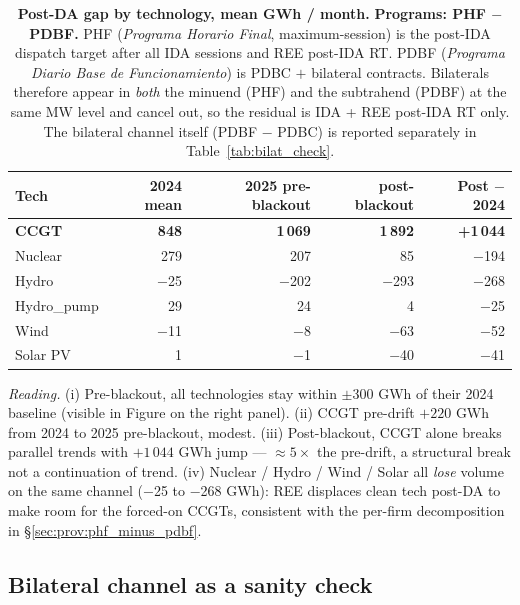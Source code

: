 \documentclass[11pt,a4paper]{article}
\begin{document}
\begin{table}[H]
\centering
\caption{\textbf{Post-DA gap by technology, mean GWh / month.} \textbf{Programs: PHF $-$ PDBF.} PHF (\emph{Programa Horario Final}, maximum-session) is the post-IDA dispatch target after all IDA sessions and REE post-IDA RT. PDBF (\emph{Programa Diario Base de Funcionamiento}) is PDBC $+$ bilateral contracts. Bilaterals therefore appear in \emph{both} the minuend (PHF) and the subtrahend (PDBF) at the same MW level and cancel out, so the residual is IDA + REE post-IDA RT only. The bilateral channel itself (PDBF $-$ PDBC) is reported separately in Table~\ref{tab:bilat_check}.}
\label{tab:gap_pretrends}
\begin{tabular}{l r r r r}
\toprule
Tech & 2024 mean & 2025 pre-blackout & post-blackout & Post $-$ 2024 \\
\midrule
\textbf{CCGT}   & \textbf{848}  & \textbf{1\,069} & \textbf{1\,892} & \textbf{+1\,044} \\
Nuclear         &  279          &     207         &      85         &   $-$194  \\
Hydro           & $-$25         &  $-$202         &   $-$293        &   $-$268  \\
Hydro\_pump     &   29          &      24         &       4         &   $-$25   \\
Wind            & $-$11         &   $-$8          &   $-$63         &   $-$52   \\
Solar PV        &    1          &   $-$1          &   $-$40         &   $-$41   \\
\bottomrule
\end{tabular}
\end{table}

\textit{Reading.} (i) Pre-blackout, all technologies stay within $\pm$300 GWh of their 2024 baseline (visible in Figure on the right panel). (ii) CCGT pre-drift $+220$ GWh from 2024 to 2025 pre-blackout, modest. (iii) Post-blackout, CCGT alone breaks parallel trends with $+1\,044$ GWh jump --- $\approx 5\times$ the pre-drift, a structural break not a continuation of trend. (iv) Nuclear / Hydro / Wind / Solar all \emph{lose} volume on the same channel ($-$25 to $-$268 GWh): REE displaces clean tech post-DA to make room for the forced-on CCGTs, consistent with the per-firm decomposition in \S\ref{sec:prov:phf_minus_pdbf}.

\subsection{Bilateral channel as a sanity check}\label{sec:prov:q1_drop:bilat}
\end{document}
